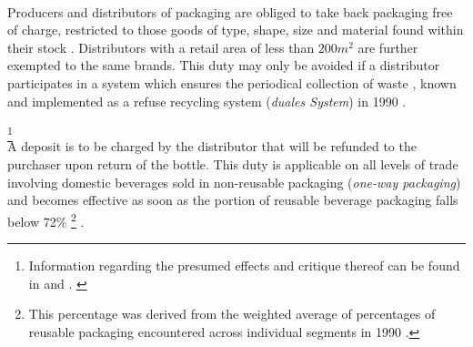 \begin{description}[format={\storedescriptionlabel}]
	\item[Obligation to take back packaging]
	\hfill \\
	Producers and distributors of packaging are obliged to take back packaging free of charge, restricted to those goods of type, shape, size and material found within their stock \cite[§§~4-6]{verpackV1991}. Distributors with a retail area of less than $200m^2$ are further exempted to the same brands. This duty may only be avoided if a distributor participates in a system which ensures the periodical collection of waste \cite[§~6]{verpackV1991}, known and implemented as a refuse recycling system (\textit{duales System}) in 1990 \cite[p.~3]{Hartlep2011Recycling}.
	\item[Obligation to levy deposits on \gls{beverage packaging}\label{itm:levyDepositObligation}] \footnote{Information regarding the presumed effects and critique thereof can be found in \cite[p.~630]{Cora2000} and \cite{wacker2008pflichtpfand}. \label{ftn:presumedEffects}}
	\hfill \\
	A deposit is to be charged by the distributor that will be refunded to the purchaser upon return of the bottle. This duty is applicable on all levels of trade involving domestic beverages sold in non-\gls{reusable packaging} (\textit{one-way packaging}) \cite[§~7]{verpackV1991} and becomes effective as soon as the portion of reusable beverage packaging falls below 72\% \footnote{This percentage was derived from the weighted average of percentages of reusable packaging encountered across individual segments in 1990 \cite[§~9]{verpackV1991} \cite[p.~134]{Rummler/Schutt1991}.} \cite[§~9]{verpackV1991}.
\end{description}

